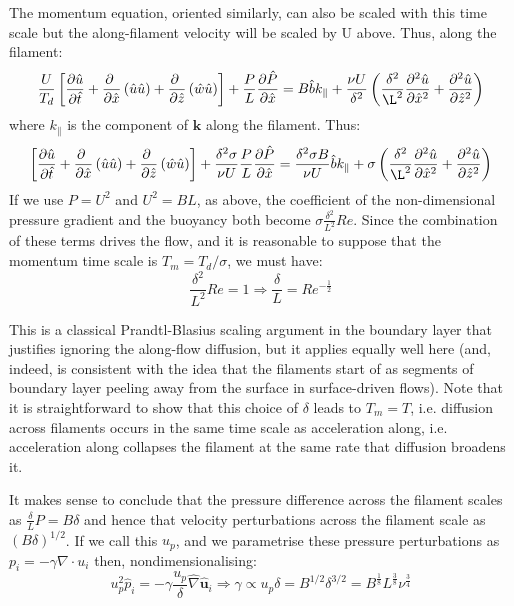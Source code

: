 \documentclass[a4paper,10pt]{article}
\begin{document}
The momentum equation, oriented similarly, can also be scaled with this time scale but the along-filament velocity will be scaled by U above. 
Thus, along the filament:
\begin{equation}
\frac{U}{T_d}\left[\frac{\partial {\hat{u}} }{\partial \hat{t}} +
\frac{\partial ~}{\partial \hat{x}}\left(\hat{u} \hat{u}\right) 
+ \frac{\partial ~}{\partial\hat{z}}\left(\hat{w} \hat{u}\right)
\right]+\frac{P}{L}\frac{\partial \hat{P}}{\partial \hat{x}} = B\hat{b} k_\parallel + 
\frac{\nu U}{\delta^2}
\left(\frac{\delta^2}{\L^2} \frac{\partial^2 \hat{u}}{\partial \hat{x}^2} + \frac{\partial^2 \hat{u}}{\partial \hat{z}^2} \right)
\end{equation}
where $k_\parallel$ is the component of $\mathbf{k}$ along the filament.
Thus:
\begin{equation}
\left[\frac{\partial {\hat{u}} }{\partial \hat{t}} +
\frac{\partial ~}{\partial \hat{x}}\left(\hat{u} \hat{u}\right) 
+ \frac{\partial ~}{\partial\hat{z}}\left(\hat{w} \hat{u}\right)
\right]
+\frac{\delta^2\sigma}{\nu U}\frac{P}{L}\frac{\partial \hat{P}}{\partial \hat{x}} = \frac{\delta^2\sigma B}{\nu U}\hat{b} k_\parallel + 
\sigma
\left(\frac{\delta^2}{\L^2} \frac{\partial^2 \hat{u}}{\partial \hat{x}^2} + \frac{\partial^2 \hat{u}}{\partial \hat{z}^2} \right)
\end{equation}
If we use $P=U^2$ and $U^2=BL$, as above, the coefficient of the non-dimensional pressure gradient and the buoyancy both become $\sigma \frac{\delta^2}{L^2} Re$.
Since the combination of these terms drives the flow, and it is reasonable to suppose that the momentum time scale is $ T_m=T_d/\sigma$, we must have:
\begin{equation}
\frac{\delta^2}{L^2} Re = 1 \Rightarrow \frac{\delta}{L} =  Re^{-\frac{1}{2}}
\end{equation} 

This is a classical Prandtl-Blasius scaling argument in the boundary layer that justifies ignoring the along-flow diffusion, but it applies equally well here (and, indeed, is consistent with the idea that the filaments start of as segments of boundary layer peeling away from the surface in surface-driven flows). Note that it is straightforward to show that this choice of $\delta$ leads to $T_m=T$, i.e. diffusion across filaments occurs in the same time scale as acceleration along, i.e. acceleration along collapses the filament at the same rate that diffusion broadens it.

It makes sense to conclude that the pressure difference across the filament scales as $\frac{\delta}{L}P = B \delta$ and hence that velocity perturbations across the filament scale as $(B\delta)^{1/2}$. 
If we call this $u_p$, and we parametrise these pressure perturbations as $p_i=-\gamma \nabla \cdot u_i$ then, nondimensionalising:
\begin{equation}
u_p^2 \hat{p}_i = -\gamma \frac{u_p}{\delta} \hat{\nabla} \hat{\mathbf{u}}_i\Rightarrow \gamma \propto u_p \delta = B^{1/2}\delta^{3/2}=B^\frac{1}{8} L^\frac{3}{8} \nu^\frac{3}{4} 
\end{equation}  
\end{document}
